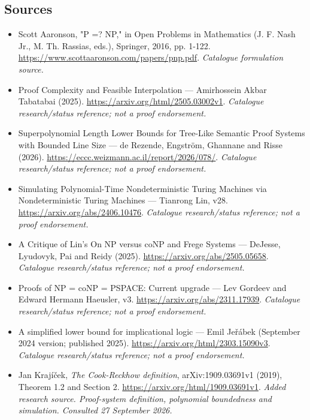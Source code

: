 \documentclass[11pt,a4paper]{article}
\begin{document}
\subsection{Sources}
\begin{itemize}\raggedright
\item[\textnormal{[S1]}]\hypertarget{source:statement:1}{} Scott Aaronson, "P =? NP," in Open Problems in Mathematics (J. F. Nash Jr., M. Th. Rassias, eds.), Springer, 2016, pp. 1-122.
\url{https://www.scottaaronson.com/papers/pnp.pdf}.
{\small\textit{Catalogue formulation source.}}
\item[\textnormal{[S2]}]\hypertarget{source:statement:2}{} Proof Complexity and Feasible Interpolation — Amirhossein Akbar Tabatabai (2025).
\url{https://arxiv.org/html/2505.03002v1}.
{\small\textit{Catalogue research/status reference; not a proof endorsement.}}
\item[\textnormal{[S3]}]\hypertarget{source:statement:3}{} Superpolynomial Length Lower Bounds for Tree-Like Semantic Proof Systems with Bounded Line Size — de Rezende, Engström, Ghannane and Risse (2026).
\url{https://eccc.weizmann.ac.il/report/2026/078/}.
{\small\textit{Catalogue research/status reference; not a proof endorsement.}}
\item[\textnormal{[S4]}]\hypertarget{source:statement:4}{} Simulating Polynomial-Time Nondeterministic Turing Machines via Nondeterministic Turing Machines — Tianrong Lin, v28.
\url{https://arxiv.org/abs/2406.10476}.
{\small\textit{Catalogue research/status reference; not a proof endorsement.}}
\item[\textnormal{[S5]}]\hypertarget{source:statement:5}{} A Critique of Lin's On NP versus coNP and Frege Systems — DeJesse, Lyudovyk, Pai and Reidy (2025).
\url{https://arxiv.org/abs/2505.05658}.
{\small\textit{Catalogue research/status reference; not a proof endorsement.}}
\item[\textnormal{[S6]}]\hypertarget{source:statement:6}{} Proofs of NP = coNP = PSPACE: Current upgrade — Lev Gordeev and Edward Hermann Haeusler, v3.
\url{https://arxiv.org/abs/2311.17939}.
{\small\textit{Catalogue research/status reference; not a proof endorsement.}}
\item[\textnormal{[S7]}]\hypertarget{source:statement:7}{} A simplified lower bound for implicational logic — Emil Jeřábek (September 2024 version; published 2025).
\url{https://arxiv.org/html/2303.15090v3}.
{\small\textit{Catalogue research/status reference; not a proof endorsement.}}
\item[\textnormal{[E1]}]\hypertarget{extra:statement:1}{} Jan Krajíček, \emph{The Cook-Reckhow definition}, arXiv:1909.03691v1 (2019), Theorem 1.2 and Section 2.
\url{https://arxiv.org/html/1909.03691v1}.
{\small\textit{Added research source. Proof-system definition, polynomial boundedness and simulation. Consulted 27 September 2026.}}
\end{itemize}

\end{document}
